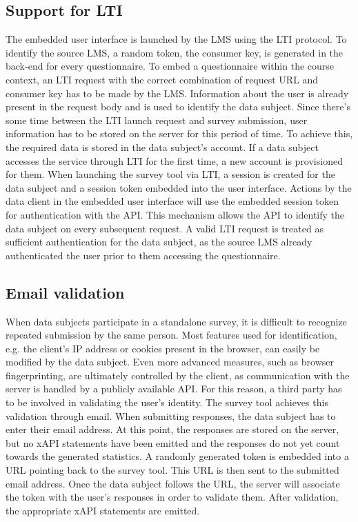 \subsection{Support for LTI}
\label{section:concept:lti}
    The embedded user interface is launched by the LMS using the LTI protocol.
    To identify the source LMS, a random token, the consumer key,
    is generated in the back-end for every questionnaire. To
    embed a questionnaire within the course context, an LTI request
    with the correct combination of request URL and consumer
    key has to be made by the LMS.
    Information about the user is already present in the
    request body and is used to identify the data subject. 
    Since there's some time between the LTI launch request
    and survey submission, user information
    has to be stored on the server for this period of time.
    To achieve this, the required data is stored in the data subject's account.
    If a data subject accesses the service through LTI for the first time, 
    a new account is provisioned for them.
    When launching the survey tool via LTI, a session is created
    for the data subject and a session token embedded into
    the user interface. Actions by the data client in the
    embedded user interface will use the embedded session token
    for authentication with the API. This mechanism allows
    the API to identify the data subject on every subsequent
    request. A valid LTI request is treated as sufficient
    authentication for the data subject, as the source LMS already
    authenticated the user prior to them accessing the questionnaire.

\subsection{Email validation}
    When data subjects participate in a standalone survey,
    it is difficult to recognize repeated submission by the same
    person. Most features used for identification, e.g. the client's
    IP address or cookies present in the browser, can easily be
    modified by the data subject. Even more
    advanced measures, such as browser fingerprinting, are ultimately
    controlled by the client, as communication with the server
    is handled by a publicly available API. For this reason,
    a third party has to be involved in validating the user's identity.
    The survey tool achieves this validation through email.
    When submitting responses, the data subject has to enter their
    email address. At this point, the responses are stored on the server,
    but no xAPI statements have been emitted and the responses do not
    yet count towards the generated statistics. 
    A randomly generated token is embedded into a URL pointing back to the survey tool. 
    This URL is then sent to the submitted email address. 
    Once the data subject follows the URL, the server will associate the 
    token with the user's responses in order to validate them.
    After validation, the appropriate xAPI statements are emitted.

